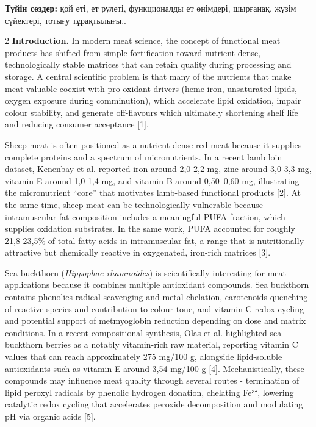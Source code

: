 {\bfseries Түйін сөздер:} қой еті, ет рулеті, функционалды ет өнімдері,
шырғанақ, жүзім сүйектері, тотығу тұрақтылығы..

\begin{multicols}{2}
{\bfseries Introduction.} In modern meat science, the concept of functional
meat products has shifted from simple fortification toward
nutrient-dense, technologically stable matrices that can retain quality
during processing and storage. A central scientific problem is that many
of the nutrients that make meat valuable coexist with pro-oxidant
drivers (heme iron, unsaturated lipids, oxygen exposure during
comminution), which accelerate lipid oxidation, impair colour stability,
and generate off-flavours which ultimately shortening shelf life and
reducing consumer acceptance {[}1{]}.

Sheep meat is often positioned as a nutrient-dense red meat because it
supplies complete proteins and a spectrum of micronutrients. In a recent
lamb loin dataset, Kenenbay et al. reported iron around 2,0-2,2 mg, zinc
around 3,0-3,3 mg, vitamin E around 1,0-1,4 mg, and vitamin
B around 0,50--0,60 mg, illustrating the micronutrient
``core'' that motivates lamb-based functional products {[}2{]}. At the
same time, sheep meat can be technologically vulnerable because
intramuscular fat composition includes a meaningful PUFA fraction, which
supplies oxidation substrates. In the same work, PUFA accounted for
roughly 21,8-23,5\% of total fatty acids in intramuscular fat, a range
that is nutritionally attractive but chemically reactive in oxygenated,
iron-rich matrices {[}3{]}.

Sea buckthorn (\emph{Hippophae rhamnoides}) is scientifically
interesting for meat applications because it combines multiple
antioxidant compounds. Sea buckthorn contains phenolics-radical
scavenging and metal chelation, carotenoids-quenching of reactive
species and contribution to colour tone, and vitamin C-redox cycling and
potential support of metmyoglobin reduction depending on dose and matrix
conditions. In a recent compositional synthesis, Olas et al. highlighted
sea buckthorn berries as a notably vitamin-rich raw material, reporting
vitamin C values that can reach approximately 275 mg/100 g, alongside
lipid-soluble antioxidants such as vitamin E around 3,54 mg/100 g
{[}4{]}. Mechanistically, these compounds may influence meat quality
through several routes - termination of lipid peroxyl radicals by
phenolic hydrogen donation, chelating Fe³⁺, lowering catalytic redox
cycling that accelerates peroxide decomposition and modulating pH via
organic acids {[}5{]}.


\end{multicols}
